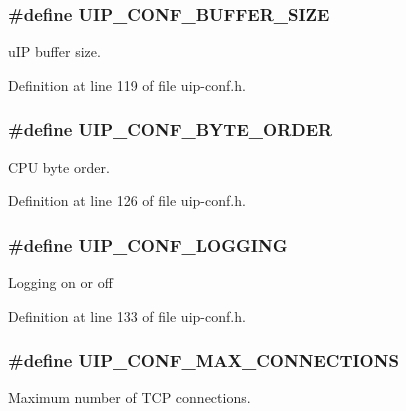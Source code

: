 \hypertarget{group__uipfw_gacacc406c3bf7d0e00412e4c946252739}{
\subsubsection[{UIP\_\-CONF\_\-BUFFER\_\-SIZE}]{\setlength{\rightskip}{0pt plus 5cm}\#define UIP\_\-CONF\_\-BUFFER\_\-SIZE}}
\label{group__uipfw_gacacc406c3bf7d0e00412e4c946252739}
uIP buffer size. 

Definition at line 119 of file uip-\/conf.h.

\hypertarget{group__uipfw_gaca1240bba5dd57f8c7c27123c84a1f6d}{
\subsubsection[{UIP\_\-CONF\_\-BYTE\_\-ORDER}]{\setlength{\rightskip}{0pt plus 5cm}\#define UIP\_\-CONF\_\-BYTE\_\-ORDER}}
\label{group__uipfw_gaca1240bba5dd57f8c7c27123c84a1f6d}
CPU byte order. 

Definition at line 126 of file uip-\/conf.h.

\hypertarget{group__uipfw_ga3001114ddadc1f2ada5cc9a780e866fc}{
\subsubsection[{UIP\_\-CONF\_\-LOGGING}]{\setlength{\rightskip}{0pt plus 5cm}\#define UIP\_\-CONF\_\-LOGGING}}
\label{group__uipfw_ga3001114ddadc1f2ada5cc9a780e866fc}
Logging on or off 

Definition at line 133 of file uip-\/conf.h.

\hypertarget{group__uipfw_ga3f6f1f6f98431f2d33ed30a30d2ccc35}{
\subsubsection[{UIP\_\-CONF\_\-MAX\_\-CONNECTIONS}]{\setlength{\rightskip}{0pt plus 5cm}\#define UIP\_\-CONF\_\-MAX\_\-CONNECTIONS}}
\label{group__uipfw_ga3f6f1f6f98431f2d33ed30a30d2ccc35}
Maximum number of TCP connections. 

